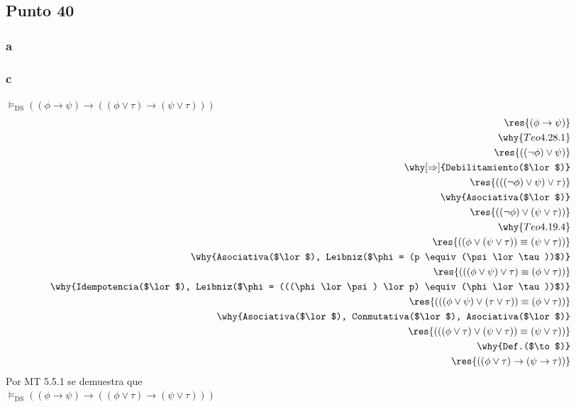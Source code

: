 \documentclass{article}
\begin{document}
\subsection{Punto 40}
\subsubsection{a}
\subsubsection{c}
\label{P40-c}
\begin{logicenv}[5]{$\vDash_\text{DS} ((\phi \to \psi) \to ((\phi \lor \tau) \to (\psi \lor \tau)))$}
    \begin{align*}
            \res{(\phi \to \psi)}\\
        \why{Teo 4.28.1}\\
            \res{((\neg \phi) \lor \psi)}\\
        \why[\Rightarrow]{Debilitamiento($\lor$)}\\
            \res{(((\neg \phi) \lor \psi) \lor \tau)}\\
        \why{Asociativa($\lor$)}\\
            \res{((\neg \phi) \lor (\psi \lor \tau))}\\
        \why{Teo 4.19.4}\\
            \res{((\phi \lor (\psi \lor \tau)) \equiv (\psi \lor \tau))}\\
        \why{Asociativa($\lor$), Leibniz($\phi = (p \equiv (\psi \lor \tau))$)}\\
            \res{(((\phi \lor \psi) \lor \tau) \equiv (\phi \lor \tau))}\\
        \why{Idempotencia($\lor$), Leibniz($\phi = (((\phi \lor \psi) \lor p) \equiv (\phi \lor \tau))$)}\\
            \res{(((\phi \lor \psi) \lor (\tau \lor \tau)) \equiv (\phi \lor \tau))}\\
        \why{Asociativa($\lor$), Conmutativa($\lor$), Asociativa($\lor$)}\\
            \res{(((\phi \lor \tau) \lor (\psi \lor \tau)) \equiv (\psi \lor \tau))}\\
        \why{Def.($\to$)}\\
            \res{((\phi \lor \tau) \to (\psi \to \tau))}
    \end{align*}
    Por MT 5.5.1 se demuestra que\\
    $\vDash_\text{DS} ((\phi \to \psi) \to ((\phi \lor \tau) \to (\psi \lor \tau)))$
\end{logicenv}
\end{document}
